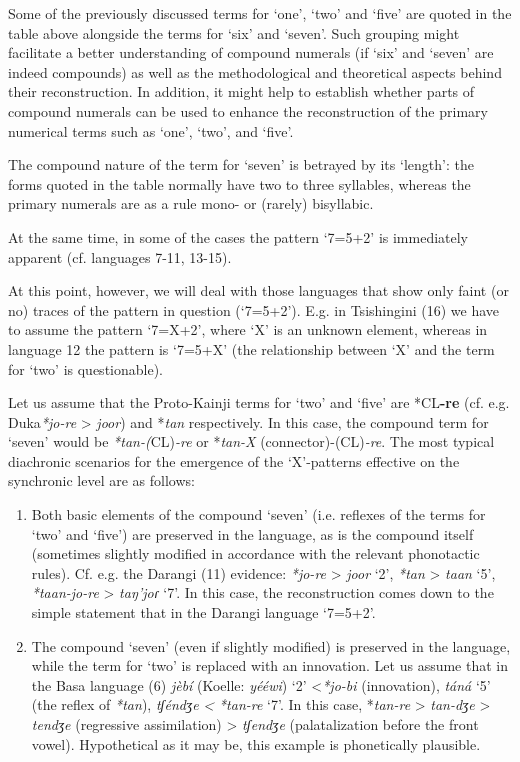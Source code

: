 \newpage 
Some of the previously discussed terms for ‘one’, ‘two’ and ‘five’ are quoted in the table above alongside the terms for ‘six’ and ‘seven’. Such grouping might facilitate a better understanding of compound numerals (if ‘six’ and ‘seven’ are indeed compounds) as well as the methodological and theoretical aspects behind their reconstruction. In addition, it might help to establish whether parts of compound numerals can be used to enhance the reconstruction of the primary numerical terms such as ‘one’, ‘two’, and ‘five’.

The compound nature of the term for ‘seven’ is betrayed by its ‘length’: the forms quoted in the table normally have two to three syllables, whereas the primary numerals are as a rule mono- or (rarely) bisyllabic.

At the same time, in some of the cases the pattern ‘7=5+2’ is immediately apparent (cf. languages 7-11, 13-15). 

At this point, however, we will deal with those languages that show only faint (or no) traces of the pattern in question (‘7=5+2’). E.g. in Tsishingini (16) we have to assume the pattern ‘7=X+2’, where ‘X’ is an unknown element, whereas in language 12 the pattern is ‘7=5+X’ (the relationship between ‘X’ and the term for ‘two’ is questionable). 

Let us assume that the Proto-Kainji terms for ‘two’ and ‘five’ are *CL\textbf{-re}  (cf. e.g. Duka\textit{*jo-re} > \textit{joor}) and *\textit{tan} respectively. In this case, the compound term for ‘seven’ would be \textit{*tan-(}CL)\textit{-re} or *\textit{tan-X} (connector)-(CL)\textit{-re}. The most typical diachronic scenarios for the emergence of the ‘X’-patterns effective on the synchronic level are as follows:

\begin{enumerate}
\item Both basic elements of the compound ‘seven’ (i.e. reflexes of the terms for ‘two’ and ‘five’) are preserved in the language, as is the compound itself (sometimes slightly modified in accordance with the relevant phonotactic rules). Cf. e.g. the Darangi (11) evidence: \textit{*jo-re} > \textit{joor} ‘2’, \textit{*tan} > \textit{taan} ‘5’, \textit{*taan-jo-re} > \textit{taŋ’joɾ} ‘7’. In this case, the reconstruction comes down to the simple statement that in the Darangi language ‘7=5+2’.
\item The compound ‘seven’ (even if slightly modified) is preserved in the language, while the term for ‘two’ is replaced with an innovation. Let us assume that in the Basa language (6) \textit{jèbí} (Koelle: \textit{yééwi}) ‘2’ <\textit{*jo-bi} (innovation), \textit{táná} ‘5’ (the reflex of \textit{*tan}), \textit{tʃéndʒe} \textit{<} \textit{*tan-re} ‘7’. In this case, *\textit{tan-re} > \textit{tan-dʒe} > \textit{tendʒe} (regressive assimilation) > \textit{tʃendʒe} (palatalization before the front vowel). Hypothetical as it may be, this example is phonetically plausible.
\end{enumerate}

